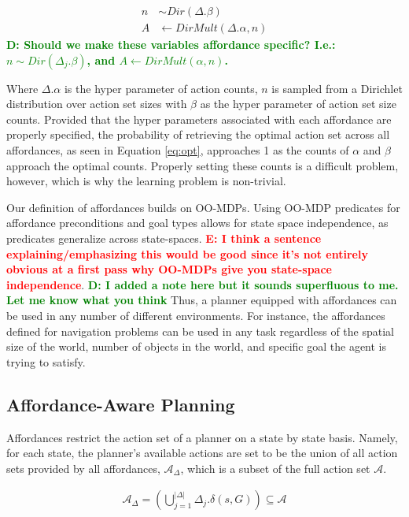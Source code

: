 \documentclass[conference]{IEEEtran}
\newcommand{\dnote}[1]{\textcolor{Green}{\textbf{D: #1}}}
\newcommand{\enote}[1]{\textcolor{Red}{\textbf{E: #1}}}
\begin{document}
\begin{equation} 
\begin{split}
n &\sim Dir(\Delta.\beta) \\
A &\leftarrow DirMult(\Delta.\alpha, n)
\end{split}
\label{eq:dir_mult_sample}
\end{equation}
\dnote{Should we make these variables affordance specific? I.e.: $n \sim Dir(\Delta_j.\beta)$, and $A \leftarrow DirMult(\alpha,n)$.}

Where $\Delta.\alpha$ is the hyper parameter of action counts, $n$ is sampled 
from a Dirichlet distribution over action set sizes with $\beta$ as the hyper parameter
of action set size counts. Provided that the hyper parameters associated with each 
affordance are properly specified, the probability of retrieving the optimal action set 
across all affordances, as seen in Equation \ref{eq:opt}, approaches 1 as the counts 
of $\alpha$ and $\beta$ approach the optimal counts. Properly setting these counts 
is a difficult problem, however, which is why the learning problem is non-trivial.

Our definition of affordances builds on OO-MDPs. Using OO-MDP predicates for affordance
preconditions and goal types allows for state space independence, as predicates generalize across state-spaces. 
\enote{I think a sentence explaining/emphasizing this would be good since it's not entirely obvious at a first pass why OO-MDPs give you state-space independence}. \dnote{I added a note here but it sounds superfluous to me. Let me know what you think} 
Thus, a planner equipped with affordances can be used in any number of
different environments. For instance, the affordances defined for navigation problems 
can be used in any task regardless of the spatial size of the world, number of objects in 
the world, and specific goal the agent is trying to satisfy.

\subsection{Affordance-Aware Planning}
Affordances restrict the action set of a planner on a state by state basis. 
Namely, for each state, the planner's available actions are set to be the 
union of all action sets provided by all affordances, $\mathcal{A}_{\Delta}$, 
which is a subset of the full action set $\mathcal{A}$. 

\begin{align}
\mathcal{A}_{\Delta} = \left(\bigcup\limits_{j = 1}^{|\Delta|} \Delta_j.\delta(s,G) \right) \subseteq \mathcal{A}
\label{eq:afford_union}
\end{align}
\end{document}
